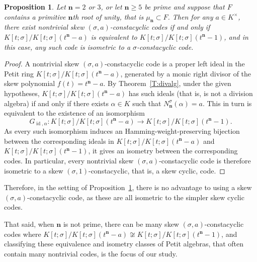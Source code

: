 \documentclass[11pt]{amsart}
\theoremstyle{plain}
\newtheorem{proposition}[theorem]{Proposition}
\theoremstyle{definition}
\numberwithin{equation}{section}
\numberwithin{figure}{section}
\newcommand{\Kone}[1]{K[t;\sigma]/K[t;\sigma](t^{\de}-#1)}
\DeclareMathOperator{\id}{id}
\newcommand{\de}{{\mathbf{n}}}  %
\begin{document}
\begin{proposition}\label{P:allcodesareconstacyclicifprime}
Let  $\de=2$ or $3$, or let $\de\geq 5$ be prime and suppose that $F$ contains a primitive $\de$th root of unity, that is $\mu_\de\subset F$. Then for any $a\in K^\times$, there exist nontrivial skew $(\sigma,a)$-constacyclic codes if and only if $\Kone{a}$ is equivalent to $\Kone{1}$, and in this case, any such code is isometric to a $\sigma$-constacyclic code.
\end{proposition}

\begin{proof}
  A nontrivial skew $(\sigma,a)$-constacyclic code is a  proper left ideal  in the Petit ring
$\Kone{a}$, generated by a monic right divisor of the skew polynomial $f(t)=t^\de-a$.  By Theorem~\ref{T:divalg}, %
under the given  hypotheses, $K[t;\sigma]/K[t;\sigma](t^\de-a)$ has such ideals (that is, is not a division algebra)
 if and only if there exists $\alpha\in K$ such that
$N_\de^\sigma(\alpha)=a$.
This in turn is equivalent to  the existence of an isomorphism $$G_{\id,\alpha}:K[t;\sigma]/K[t;\sigma](t^\de-a)\to K[t;\sigma]/K[t;\sigma](t^\de-1).$$  As every such isomorphism induces an Hamming-weight-preserving bijection between the corresponding ideals in $K[t;\sigma]/K[t;\sigma](t^\de-a)$ and $K[t;\sigma]/K[t;\sigma](t^\de-1)$, it gives an isometry between the corresponding codes.  In particular, every nontrivial skew $(\sigma,a)$-constacyclic code is therefore isometric to a skew $(\sigma,1)$-constacyclic, that is, a skew cyclic, code.
\end{proof}

Therefore, in the setting of Proposition~\ref{P:allcodesareconstacyclicifprime}, there is no advantage to using a skew $(\sigma,a)$-constacyclic code, as these are all isometric to the simpler skew cyclic codes.

That said, when $\de$ is not prime, there can be many skew $(\sigma,a)$-constacyclic codes where $K[t;\sigma]/K[t;\sigma](t^\de-a)\not\cong K[t;\sigma]/K[t;\sigma](t^\de-1)$, and classifying these equivalence and isometry classes of Petit algebras, that often contain many nontrivial codes, is the focus of our study.
\end{document}
